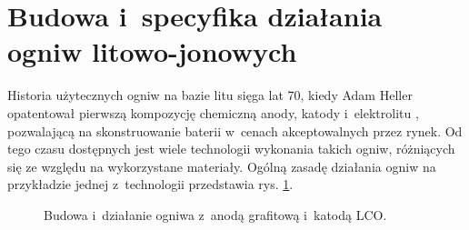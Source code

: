 \documentclass[polish,engineer]{polsl-msth}
\begin{document}
\section{Budowa i~specyfika działania ogniw litowo-jonowych}
Historia użytecznych ogniw na bazie litu sięga lat 70, kiedy Adam Heller opatentował pierwszą kompozycję chemiczną anody, katody i~elektrolitu \cite{heller1975electrochemical}, pozwalającą na skonstruowanie baterii w~cenach akceptowalnych przez rynek. Od tego czasu dostępnych jest wiele technologii wykonania takich ogniw, różniących się ze względu na wykorzystane materiały. Ogólną zasadę działania ogniw na przykładzie jednej z~technologii przedstawia rys. \ref{img:liion_structure}.
\begin{figure}[hbtp]
\centering
     \caption{Budowa i~działanie ogniwa z~anodą grafitową i~katodą LCO. \cite{liionpic_wikimedia}  \label{img:liion_structure}}
\end{figure}
\end{document}
